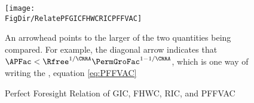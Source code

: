 \begin{figure}[ht]
  \centerline{
    \texttt{[image: \\FigDir/RelatePFGICFHWCRICPFFVAC]}
  }
  \caption{Perfect Foresight Relation of GIC, FHWC, RIC, and PFFVAC}
  \footnotesize{An arrowhead points to the larger of the two quantities being compared.  For example, the diagonal arrow indicates that $\APFac < \Rfree^{1/\CRRA}\PermGroFac^{1-1/\CRRA}$, which is one way of writing the {\PFFVAC}, equation \eqref{eq:PFFVAC}}
\end{figure}
